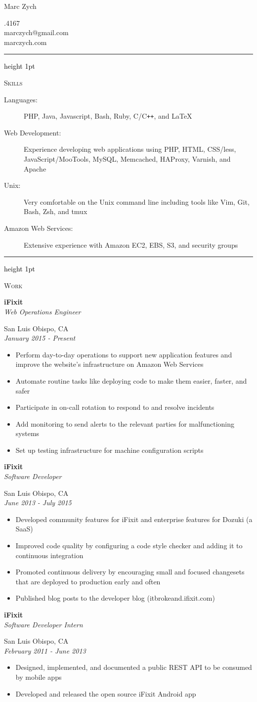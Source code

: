 \documentclass[letterpaper,10pt]{article}
\newcommand{\resauthor}[4]{
   \begin{minipage}[c]{.4\textwidth}
      \raggedright
      {\Huge #1}
   \end{minipage}
   \hfill
   \begin{minipage}[c]{.4\textwidth}
      \raggedleft
      #2\\
      #3\\
      #4
   \end{minipage}
}
\newcommand{\ressectiondivider}{
   \textcolor{black}{\hrule height 1pt}
}
\newcommand{\resitem}[1]{\item #1 \vspace{-2pt}}
\newcommand{\ressubheading}[4]{
   \begin{minipage}[t]{10cm}
      \flushleft
      \large{\textbf{#1}}\\
      \normalsize{\textit{#3}}\\
   \end{minipage}
   \hfill
   \begin{minipage}[t]{5cm}
      \flushright
      #2\\
      \textit{#4}\\
   \end{minipage}
}
\newenvironment{ressection}[1]{
   \vspace{12pt}
   \ressectiondivider
   \vspace{5pt}
   \begin{minipage}[t]{2.75cm}
      \flushleft
      \Large{\textrm{\textsc{#1}}}
   \end{minipage}
   \hfill
   \begin{minipage}[t]{16cm}
      \flushleft
}{
   \end{minipage}
}
\begin{document}
\resauthor{Marc Zych}{805.217.4167}{marczych@gmail.com}{marczych.com}

\begin{ressection}{Skills}
   \begin{description}
      \item[Languages:]
      PHP, Java, Javascript, Bash, Ruby, C/C{}\verb!++!, and \LaTeX
      \item[Web Development:]
      Experience developing web applications using PHP, HTML, CSS/less, JavaScript/MooTools, MySQL, Memcached, HAProxy, Varnish, and Apache
      \item[Unix:]
      Very comfortable on the Unix command line including tools like Vim, Git, Bash, Zsh, and tmux
      \item[Amazon Web Services:]
      Extensive experience with Amazon EC2, EBS, S3, and security groups
   \end{description}
\end{ressection}

\begin{ressection}{Work}
   \ressubheading{iFixit}{San Luis Obispo, CA}{Web Operations Engineer}{January 2015 - Present}
   \begin{itemize}
      \resitem{Perform day-to-day operations to support new application features and improve the website's infrastructure on Amazon Web Services}
      \resitem{Automate routine tasks like deploying code to make them easier, faster, and safer}
      \resitem{Participate in on-call rotation to respond to and resolve incidents}
      \resitem{Add monitoring to send alerts to the relevant parties for malfunctioning systems}
      \resitem{Set up testing infrastructure for machine configuration scripts}
   \end{itemize}
   \ressubheading{iFixit}{San Luis Obispo, CA}{Software Developer}{June 2013 - July 2015}
   \begin{itemize}
      \resitem{Developed community features for iFixit and enterprise features for Dozuki (a SaaS)}
      \resitem{Improved code quality by configuring a code style checker and adding it to continuous integration}
      \resitem{Promoted continuous delivery by encouraging small and focused changesets that are deployed to production early and often}
      \resitem{Published blog posts to the developer blog (itbrokeand.ifixit.com)}
   \end{itemize}
   \ressubheading{iFixit}{San Luis Obispo, CA}{Software Developer Intern}{February 2011 - June 2013}
   \begin{itemize}
      \resitem{Designed, implemented, and documented a public REST API to be consumed by mobile apps}
      \resitem{Developed and released the open source iFixit Android app}
   \end{itemize}
\end{ressection}
\end{document}
